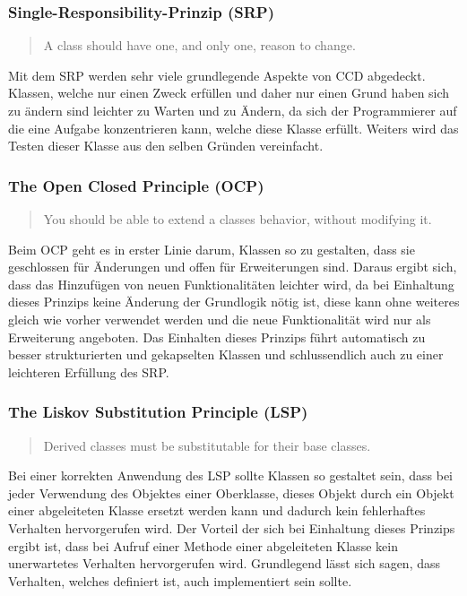 \subsubsection{Single-Responsibility-Prinzip (SRP)}
\begin{quotation}
	A class should have one, and only one, reason to change.
\end{quotation}

Mit dem SRP werden sehr viele grundlegende Aspekte von CCD abgedeckt. Klassen, welche nur einen Zweck erfüllen und daher nur einen Grund haben sich zu ändern sind leichter zu Warten und zu Ändern, da sich der Programmierer auf die eine Aufgabe konzentrieren kann, welche diese Klasse erfüllt. Weiters wird das Testen dieser Klasse aus den selben Gründen vereinfacht. 

\subsubsection{The Open Closed Principle (OCP)}
\begin{quotation}
	You should be able to extend a classes behavior, without modifying it.
\end{quotation}

Beim OCP geht es in erster Linie darum, Klassen so zu gestalten, dass sie geschlossen für Änderungen und offen für Erweiterungen sind. 
Daraus ergibt sich, dass das Hinzufügen von neuen Funktionalitäten leichter wird, da bei Einhaltung dieses Prinzips keine Änderung der Grundlogik nötig ist, diese kann ohne weiteres gleich wie vorher verwendet werden und die neue Funktionalität wird nur als Erweiterung angeboten. Das Einhalten dieses Prinzips führt automatisch zu besser strukturierten und gekapselten Klassen und schlussendlich auch zu einer leichteren Erfüllung des SRP.

\subsubsection{The Liskov Substitution Principle (LSP)}
\begin{quotation}
	Derived classes must be substitutable for their base classes.
\end{quotation}

Bei einer korrekten Anwendung des LSP sollte Klassen so gestaltet sein, dass bei jeder Verwendung des Objektes einer Oberklasse, dieses Objekt durch ein Objekt einer abgeleiteten Klasse ersetzt werden kann und dadurch kein fehlerhaftes Verhalten hervorgerufen wird. Der Vorteil der sich bei Einhaltung dieses Prinzips ergibt ist, dass bei Aufruf einer Methode einer abgeleiteten Klasse kein unerwartetes Verhalten hervorgerufen wird. Grundlegend lässt sich sagen, dass Verhalten, welches definiert ist, auch implementiert sein sollte.  

